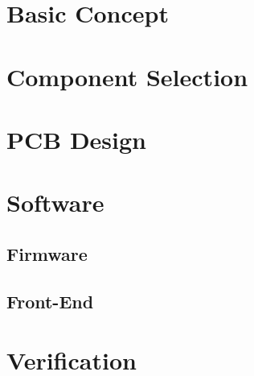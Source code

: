 \documentclass{fhnwreport/fhnwreport}
\begin{document}
\section{Basic Concept}
\label{sec:concept}



\clearpage
\section{Component Selection}
\label{sec:components}



\clearpage
\section{PCB Design}
\label{sec:pcb}



\clearpage
\section{Software}
\label{sec:software}
\subsection{Firmware}
\label{subsec:firmware}

\subsection{Front-End}
\label{subsec:frontend}



\clearpage
\section{Verification}
\label{sec:verification}



\clearpage
\end{document}
